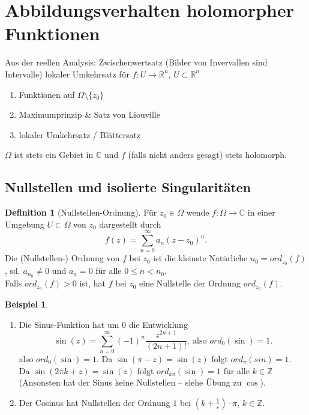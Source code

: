 \documentclass[11pt,titlepage]{article}
\theoremstyle{definition}
\newtheorem{definition}[theorem]{Definition}
\newtheorem{example}[theorem]{Beispiel}
\theoremstyle{remark}
\begin{document}
	\section{Abbildungsverhalten holomorpher Funktionen}
	
	Aus der reellen Analysis: Zwischenwertsatz (Bilder von Invervallen sind Intervalle) lokaler 
	Umkehrsatz für $f:U\to\mathbb{R}^n$, $U\subset\mathbb{R}^n$ 
	\begin{enumerate}
		\item Funktionen auf $\Omega\setminus\{z_0\}$
		\item Maximumprinzip \& Satz von Liouville
		\item lokaler Umkehrsatz / Blättersatz
	\end{enumerate}
	$\Omega$ ist stets ein Gebiet in $\mathbb{C}$ und $f$ (falls nicht anders gesagt) stets holomorph.
	
	\subsection{Nullstellen und isolierte Singularitäten}
	
	\begin{definition}[Nullstellen-Ordnung]
		Für $z_0\in\Omega$ wende $f:\Omega\to\mathbb{C}$ in einer Umgebung $U\subset\Omega$ 
		von $z_0$ dargestellt durch
		\[ f(z)=\sum_{n=0}^{\infty} a_n (z-z_0)^n .\]
		Die (Nullstellen-) Ordnung von $f$ bei $z_0$ ist die kleinste Natürliche $n_0 =ord_{z_0}(f)$, sd. 
		$a_{n_0} \neq 0$ und $a_n =0$ für alle $0\leq n<n_0$. \\
		Falls $ord_{z_0} (f)>0$ ist, hat $f$ bei $z_0$ eine Nullstelle der Ordnung $ord_{z_0} (f)$.
	\end{definition}
	
	\begin{example}
		\begin{enumerate}
			\item Die Sinus-Funktion hat um $0$ die Entwicklung
			\[ \sin(z)=\sum_{n=0}^{\infty} (-1)^n \frac{ z^{2n+1}}{(2n+1)!},\ \text{also $ord_0 (\sin)=1$.}\]
			also $ord_0 (\sin)=1$. Da $\sin(\pi -z)=\sin(z)$ folgt $ord_{\pi}(sin)=1$. \\
			Da $\sin(2\pi k +z)=\sin(z)$ folgt $ord_{k\pi}(\sin)=1$ für alle $k\in\mathbb{Z}$ (Ansonsten 
			hat der Sinus keine Nullstellen – siehe Übung zu $\cos$).
			\item Der Cosinus hat Nullstellen der Ordnung $1$ bei $(k+\frac{1}{\varepsilon})\cdot \pi$, 
			$k\in\mathbb{Z}$.
		\end{enumerate}
	\end{example}
	
\end{document}
